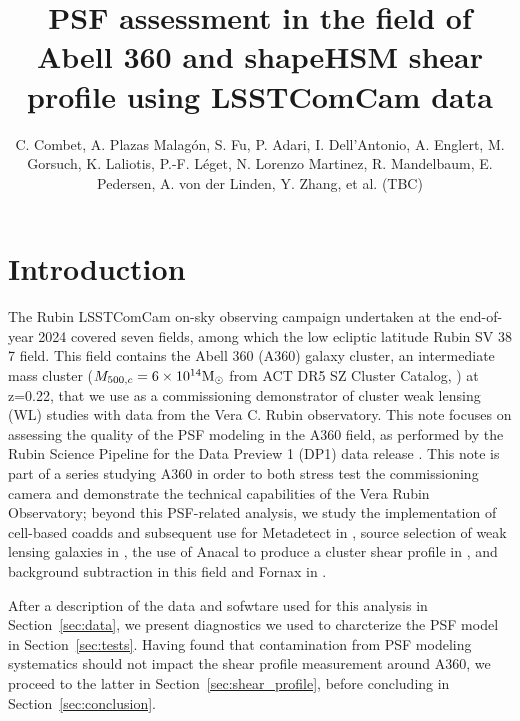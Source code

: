 \documentclass[SE,lsstdraft,authoryear,toc]{lsstdoc}
\title{PSF assessment in the field of Abell 360 and shapeHSM shear profile using LSSTComCam data}
\author{%
C. Combet, A. Plazas Malagón, S. Fu, P. Adari, I. Dell'Antonio, A. Englert, M. Gorsuch, K. Laliotis, P.-F. Léget, N. Lorenzo Martinez, R. Mandelbaum, E. Pedersen, A. von der Linden, Y. Zhang, et al. (TBC)
}
\date{\vcsDate}
\begin{document}
\maketitle

\section{Introduction}
The Rubin LSSTComCam \citep{10.71929/rubin/2561361} on-sky observing campaign 
undertaken at the end-of-year 2024 covered seven fields, among which the low ecliptic latitude Rubin SV 38 7 field. This field contains the Abell 360 (A360) galaxy cluster, an intermediate mass cluster ($M_{500,c} = 6\times 10^{14} \rm{M}_\odot$ from ACT DR5 SZ Cluster Catalog, \citealp{2021ApJS..253....3H}) at z=0.22, that we use as a commissioning demonstrator of cluster weak lensing (WL) studies with data from the Vera C. Rubin observatory. This note focuses on assessing the quality of the PSF modeling in the A360 field, as performed by the Rubin Science Pipeline  for the Data Preview 1 (DP1) data release \citep{10.71929/rubin/2570308}. This note is part of a series studying A360 in order to both stress test the commissioning camera and demonstrate the technical capabilities of the Vera Rubin Observatory; beyond this PSF-related analysis, we study the implementation of cell-based coadds and subsequent use for Metadetect in , source selection of weak lensing galaxies in , the use of Anacal to produce a cluster shear profile in , and background subtraction in this field and Fornax in .




After a description of the data and sofwtare used for this analysis in Section~\ref{sec:data}, we present diagnostics we used to charcterize the PSF model in Section~\ref{sec:tests}. Having found that contamination from PSF modeling systematics should not impact the shear profile measurement around A360, we proceed to the latter in Section~\ref{sec:shear_profile}, before concluding in Section~\ref{sec:conclusion}.
\end{document}
